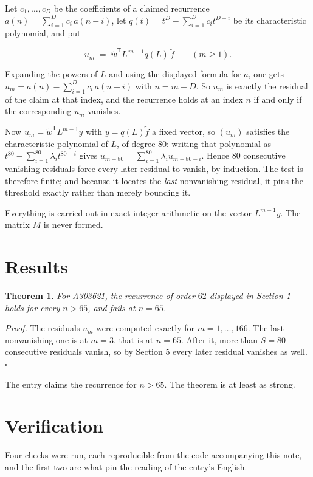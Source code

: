 \documentclass[11pt]{article}
\newtheorem{theorem}{Theorem}
\theoremstyle{definition}
\begin{document}
Let $c_1,\dots,c_D$ be the coefficients of a claimed recurrence $a(n) = \sum_{i=1}^{D} c_i\,a(n-i)$, let $q(t) = t^{D} - \sum_{i=1}^{D} c_i t^{D-i}$ be its characteristic polynomial, and put

\[u_m \;=\; \tilde w^{\mathsf T} L^{\,m-1} q(L)\,\tilde f \qquad (m \ge 1).\]

Expanding the powers of $L$ and using the displayed formula for $a$, one gets $u_m = a(n) - \sum_{i=1}^{D} c_i\,a(n-i)$ with $n = m + D$. So $u_m$ is exactly the residual of the claim at that index, and the recurrence holds at an index $n$ if and only if the corresponding $u_m$ vanishes.

Now $u_m = \tilde w^{\mathsf T} L^{m-1} y$ with $y = q(L)\tilde f$ a fixed vector, so $(u_m)$ satisfies the characteristic polynomial of $L$, of degree $80$: writing that polynomial as $t^{80} - \sum_{i=1}^{80} \lambda_i t^{80-i}$ gives $u_{m+80} = \sum_{i=1}^{80} \lambda_i u_{m+80-i}$. Hence $80$ consecutive vanishing residuals force every later residual to vanish, by induction. The test is therefore finite; and because it locates the {\itshape last} nonvanishing residual, it pins the threshold exactly rather than merely bounding it.

Everything is carried out in exact integer arithmetic on the vector $L^{m-1}y$. The matrix $M$ is never formed.

\section{Results}

\begin{theorem} For A303621, the recurrence of order $62$ displayed in Section 1 holds for every $n > 65$, and fails at $n = 65$.\end{theorem}

{\itshape Proof.} The residuals $u_m$ were computed exactly for $m = 1,\dots,166$. The last nonvanishing one is at $m = 3$, that is at $n = 65$. After it, more than $S = 80$ consecutive residuals vanish, so by Section 5 every later residual vanishes as well. $\square$

The entry claims the recurrence for $n > 65$. The theorem is at least as strong.

\section{Verification}

Four checks were run, each reproducible from the code accompanying this note, and the first two are what pin the reading of the entry's English.
\end{document}

